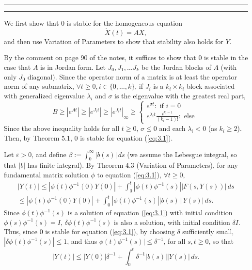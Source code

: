 \documentclass[11pt]{article}
\newcounter{questionCounter}
\newcounter{partCounter}[questionCounter]
\newenvironment{question}[2][\arabic{questionCounter}]{%
    \setcounter{partCounter}{0}%
    \vspace{.25in} \hrule \vspace{0.5em}%
        \noindent{\bf #2}%
    \vspace{0.8em} \hrule \vspace{.10in}%
    \addtocounter{questionCounter}{1}%
}{}
\newcommand{\inv}{^{-1}}
\newcommand{\e}{\varepsilon} %
\begin{document}
\newpage
\begin{question}{Problem 3}
We first show that $0$ is stable for the homogeneous equation
\begin{equation}
\dot X(t) = AX,
\label{eq:3.1}
\end{equation}
and then use Variation of Parameters to show that stability also holds for $Y$.

By the comment on page 90 of the notes, it suffices to show that $0$ is stable
in the case that $A$ is in Jordan form. Let $J_0,J_1,\dots J_k$ be the
Jordan blocks of $A$ (with only $J_0$ diagonal). Since the operator norm of a
matrix is at least the operator norm of any submatrix, $\forall t \geq 0,
i \in \{0,\dots,k\}$, if $J_i$ is a $k_i \times k_i$ block associated with
generalized eigenvalue $\lambda_i$ and $\sigma$ is the eigenvalue with the
greatest real part,
\[B
    \geq \left|e^{At}\right|
    \geq |e^{J_it}|
    \geq |e^{J_it}|_{\infty}
    \geq \left\{
        \begin{array}{cl}
            e^{\sigma t} : \mbox{ if } i = 0 \\
            e^{\lambda_i t} \frac{t^{k_i - 1}}{(k_i - 1)!} : \mbox{ else }
        \end{array}
    \right.
\]
Since the above inequality holds for all $t \geq 0$, $\sigma \leq 0$ and each
$\lambda_i < 0$ (as $k_i \geq 2$). Then, by Theorem 5.1, $0$ is stable for
equation (\ref{eq:3.1}).

Let $\e > 0$, and define $\beta := \int_0^{\infty} |b(s)| \, ds$ (we assume the
Lebesgue integral, so that $|b|$ has finite integral). By Theorem 4.3
(Variation of Parameters), for any fundamental matrix solution $\phi$ to
equation (\ref{eq:3.1}), $\forall t \geq 0$,
\begin{align*}
|Y(t)|
 \leq |\phi(t)\phi\inv(0)Y(0)|
        + \int_0^t |\phi(t)\phi\inv(s)||F(s,Y(s))| \, ds    \\
 \leq |\phi(t)\phi\inv(0)Y(0)|
        + \int_0^t |\phi(t)\phi\inv(s)||b(s)||Y(s)| \, ds.
\end{align*}
Since $\phi(t)\phi\inv(s)$ is a solution of equation (\ref{eq:3.1}) with
initial condition $\phi(s)\phi\inv(s) = I$, $\delta\phi(t)\phi\inv(s)$ is also
a solution, with initial condition $\delta I$. Thus, since $0$ is stable for
equation (\ref{eq:3.1}), by choosing $\delta$ sufficiently small,
$|\delta\phi(t)\phi\inv(s)| \leq 1$, and thus $\phi(t)\phi\inv(s)| \leq
\delta\inv$, for all $s,t \geq 0$, so that
\[|Y(t)| \leq |Y(0)|\delta\inv + \int_0^t \delta\inv|b(s)||Y(s)| \, ds.\]


\end{question}
\end{document}
